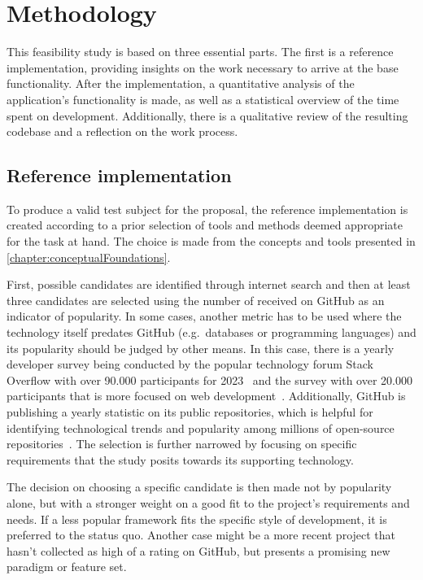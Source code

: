 \chapter{Methodology}
\label{ch:methodology}

This feasibility study is based on three essential parts.
The first is a reference implementation, providing insights on the work necessary to arrive at the base functionality.
After the implementation, a quantitative analysis of the application's functionality is made, as well as a statistical overview of the time spent on development.
Additionally, there is a qualitative review of the resulting codebase and a reflection on the work process.


\section{Reference implementation}
\label{sec:reference-implementation}

To produce a valid test subject for the proposal, the reference implementation is created according to a prior selection of tools and methods deemed appropriate for the task at hand.
The choice is made from the concepts and tools presented in \autoref{chapter:conceptualFoundations}.

First, possible candidates are identified through internet search and then at least three candidates are selected using the number of  received on GitHub as an indicator of popularity.
In some cases, another metric has to be used where the technology itself predates GitHub (e.g.\ databases or programming languages) and its popularity should be judged by other means.
In this case, there is a yearly developer survey being conducted by the popular technology forum Stack Overflow with over 90.000 participants for 2023~\parencite{stackOverflowPoll} and the  survey with over 20.000 participants that is more focused on web development~\parencite{stateOfJSSurvey}.
Additionally, GitHub is publishing a yearly statistic on its public repositories, which is helpful for identifying technological trends and popularity among millions of open-source repositories~\parencite{stateOfTheOctoverse23}.
The selection is further narrowed by focusing on specific requirements that the study posits towards its supporting technology.

The decision on choosing a specific candidate is then made not by popularity alone, but with a stronger weight on a good fit to the project's requirements and needs.
If a less popular framework fits the specific style of development, it is preferred to the status quo.
Another case might be a more recent project that hasn't collected as high of a rating on GitHub, but presents a promising new paradigm or feature set.

